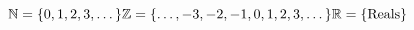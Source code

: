 \( \mathbb{N}=\{0,1,2,3,\dots\}\\
\mathbb{Z}=\{\dots,-3,-2,-1,0,1,2,3,\dots\}\\
\mathbb{R}=\{\textrm{Reals}\}\)
